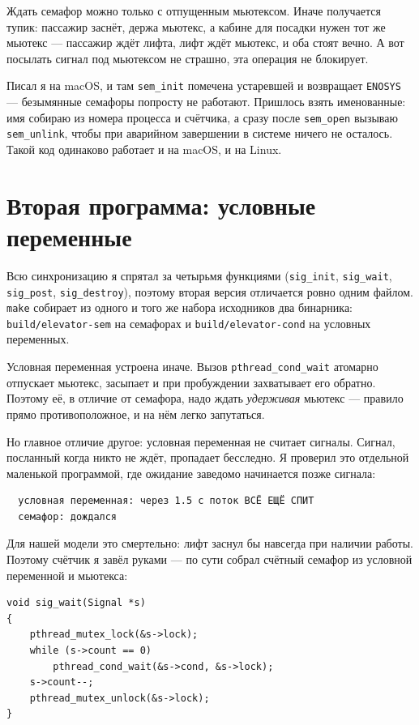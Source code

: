 \documentclass[12pt,a4paper]{article}
\begin{document}
Ждать семафор можно только с отпущенным мьютексом. Иначе получается
тупик: пассажир заснёт, держа мьютекс, а кабине для посадки нужен тот же
мьютекс --- пассажир ждёт лифта, лифт ждёт мьютекс, и оба стоят вечно.
А вот посылать сигнал под мьютексом не страшно, эта операция не
блокирует.

Писал я на macOS, и там \verb|sem_init| помечена устаревшей и возвращает
\verb|ENOSYS| --- безымянные семафоры попросту не работают. Пришлось
взять именованные: имя собираю из номера процесса и счётчика, а сразу
после \verb|sem_open| вызываю \verb|sem_unlink|, чтобы при аварийном
завершении в системе ничего не осталось. Такой код одинаково работает и
на macOS, и на Linux.

\section{Вторая программа: условные переменные}

Всю синхронизацию я спрятал за четырьмя функциями (\verb|sig_init|,
\verb|sig_wait|, \verb|sig_post|, \verb|sig_destroy|), поэтому вторая
версия отличается ровно одним файлом. \verb|make| собирает из одного и
того же набора исходников два бинарника: \verb|build/elevator-sem| на
семафорах и \verb|build/elevator-cond| на условных переменных.

Условная переменная устроена иначе. Вызов \verb|pthread_cond_wait|
атомарно отпускает мьютекс, засыпает и при пробуждении захватывает его
обратно. Поэтому её, в отличие от семафора, надо ждать \emph{удерживая}
мьютекс --- правило прямо противоположное, и на нём легко запутаться.

Но главное отличие другое: условная переменная не считает сигналы.
Сигнал, посланный когда никто не ждёт, пропадает бесследно. Я проверил
это отдельной маленькой программой, где ожидание заведомо начинается
позже сигнала:

\begin{verbatim}
  условная переменная: через 1.5 с поток ВСЁ ЕЩЁ СПИТ
  семафор: дождался
\end{verbatim}

Для нашей модели это смертельно: лифт заснул бы навсегда при наличии
работы. Поэтому счётчик я завёл руками --- по сути собрал счётный семафор
из условной переменной и мьютекса:

\begin{verbatim}
void sig_wait(Signal *s)
{
    pthread_mutex_lock(&s->lock);
    while (s->count == 0)
        pthread_cond_wait(&s->cond, &s->lock);
    s->count--;
    pthread_mutex_unlock(&s->lock);
}
\end{verbatim}
\end{document}
